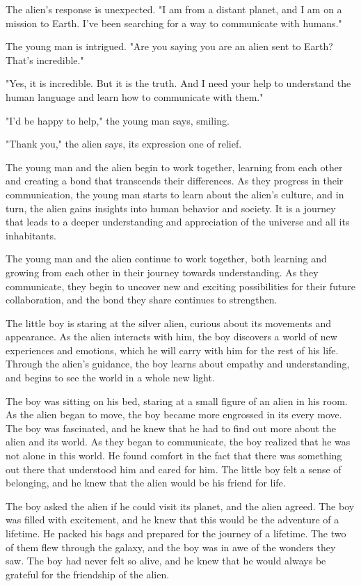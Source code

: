\documentclass[smalldemyvopaper,11pt,twoside,onecolumn,openright,extrafontsizes]{memoir}
\begin{document}
The alien's response is unexpected. "I am from a distant planet, and I am on a mission to Earth. I've been searching for a way to communicate with humans."\par
The young man is intrigued. "Are you saying you are an alien sent to Earth? That's incredible."\par
"Yes, it is incredible. But it is the truth. And I need your help to understand the human language and learn how to communicate with them."\par
"I'd be happy to help," the young man says, smiling.\par
"Thank you," the alien says, its expression one of relief.\par
The young man and the alien begin to work together, learning from each other and creating a bond that transcends their differences. As they progress in their communication, the young man starts to learn about the alien's culture, and in turn, the alien gains insights into human behavior and society. It is a journey that leads to a deeper understanding and appreciation of the universe and all its inhabitants.\par
The young man and the alien continue to work together, both learning and growing from each other in their journey towards understanding. As they communicate, they begin to uncover new and exciting possibilities for their future collaboration, and the bond they share continues to strengthen.\par
The little boy is staring at the silver alien, curious about its movements and appearance. As the alien interacts with him, the boy discovers a world of new experiences and emotions, which he will carry with him for the rest of his life. Through the alien's guidance, the boy learns about empathy and understanding, and begins to see the world in a whole new light.\par
The boy was sitting on his bed, staring at a small figure of an alien in his room. As the alien began to move, the boy became more engrossed in its every move. The boy was fascinated, and he knew that he had to find out more about the alien and its world. As they began to communicate, the boy realized that he was not alone in this world. He found comfort in the fact that there was something out there that understood him and cared for him. The little boy felt a sense of belonging, and he knew that the alien would be his friend for life.\par
The boy asked the alien if he could visit its planet, and the alien agreed. The boy was filled with excitement, and he knew that this would be the adventure of a lifetime. He packed his bags and prepared for the journey of a lifetime. The two of them flew through the galaxy, and the boy was in awe of the wonders they saw. The boy had never felt so alive, and he knew that he would always be grateful for the friendship of the alien.\par
\end{document}
